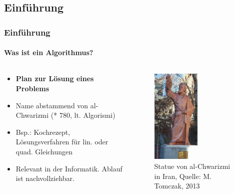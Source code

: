 \documentclass[professionalfont,serif,german]{beamer}
\begin{document}
\begin{frame}
  \section[Einführung in Algorithmen und Pathfinder]{Einführung}
  \frametitle{Einführung}
  \framesubtitle{Was ist ein Algorithmus?}
  \begin{columns}[c] %
    \begin{column}[T]{.5\textwidth} %
      \begin{itemize}
        \item \textbf{Plan zur Lösung eines Problems}
        \item Name abstammend von al-Chwarizmi (* 780, lt. Algorismi)
        \item Bsp.: Kochrezept, Lösungsverfahren für lin. oder quad. Gleichungen
        \item Relevant in der Informatik. Ablauf ist nachvollziehbar.
      \end{itemize}
    \end{column}
    \begin{column}[T]{.5\textwidth}
      \begin{figure}
        \includegraphics[height=4.5cm]{img/algorismi.png}
        \caption{Statue von al-Chwarizmi in Iran, Quelle: M. Tomczak, 2013}
      \end{figure}
    \end{column}
  \end{columns}
\end{frame}
\end{document}
